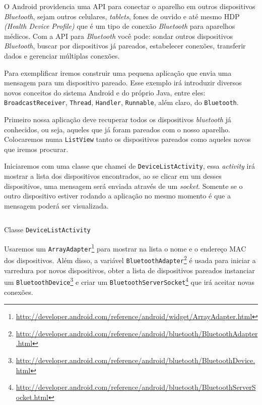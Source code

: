 \documentclass[a4paper,12pt,brazil]{book}
\begin{document}
\begin{singlespace}
	O Android providencia uma API para conectar o aparelho em outros dispositivos \emph{Bluetooth}, sejam outros celulares, \emph{tablets}, fones de ouvido e até mesmo HDP \emph{(Health Device Profile)} que é um tipo de conexão \emph{Bluetooth} para aparelhos médicos. Com a API para \emph{Bluetooth} você pode: sondar outros dispositivos \emph{Bluetooth}, buscar por dispositivos já pareados, estabelecer conexões, transferir dados e gerenciar múltiplas conexões.

	Para exemplificar iremos construir uma pequena aplicação que envia uma mensagem para um dispositivo pareado. Esse exemplo irá introduzir diversos novos conceitos do sistema Android e do próprio Java, entre eles: \texttt{BroadcastReceiver}, \texttt{Thread}, \texttt{Handler}, \texttt{Runnable}, além claro, do \texttt{Bluetooth}.
 
	 Primeiro nossa aplicação deve recuperar todos os dispositivos \emph{bluetooth} já conhecidos, ou seja, aqueles que já foram pareados com o nosso aparelho. Colocaremos numa \texttt{ListView} tanto os dispositivos pareados como aqueles novos que iremos procurar. 

	Iniciaremos com uma classe que chamei de \texttt{DeviceListActivity}, essa \emph{activity} irá mostrar a lista dos dispositivos encontrados, ao se clicar em um desses dispositivos, uma mensagem será enviada através de um \emph{socket}. Somente se o outro dispositivo estiver rodando a aplicação no mesmo momento é que a mensagem poderá ser visualizada.

	\begin{listing}[H]
	\inputminted[linenos=true,fontsize=\small,frame=lines, framesep=2mm, tabsize=2,numbersep=5pt]{java}{src/api/bluetooth/activity.java}
	\caption{Classe \texttt{DeviceListActivity}}
	\label{code:bluetooth-activity}
	\end{listing} 			

	Usaremos um \texttt{ArrayAdapter}\footnote{\href{http://developer.android.com/reference/android/widget/ArrayAdapter.html}{http://developer.android.com/reference/android/widget/ArrayAdapter.html}} para mostrar na lista o nome e o endereço MAC dos dispositivos. Além disso, a variável \texttt{BluetoothAdapter}\footnote{\href{http://developer.android.com/reference/android/bluetooth/BluetoothAdapter.html}{http://developer.android.com/reference/android/bluetooth/BluetoothAdapter.html}} é usada para iniciar a varredura por novos dispositivos, obter a lista de dispositivos pareados instanciar um \texttt{BluetoothDevice}\footnote{\href{http://developer.android.com/reference/android/bluetooth/BluetoothDevice.html}{http://developer.android.com/reference/android/bluetooth/BluetoothDevice.html}} e criar um \texttt{BluetoothServerSocket}\footnote{\href{http://developer.android.com/reference/android/bluetooth/BluetoothServerSocket.html}{http://developer.android.com/reference/android/bluetooth/BluetoothServerSocket.html}} que irá aceitar novas conexões. 


\end{singlespace}
\end{document}
